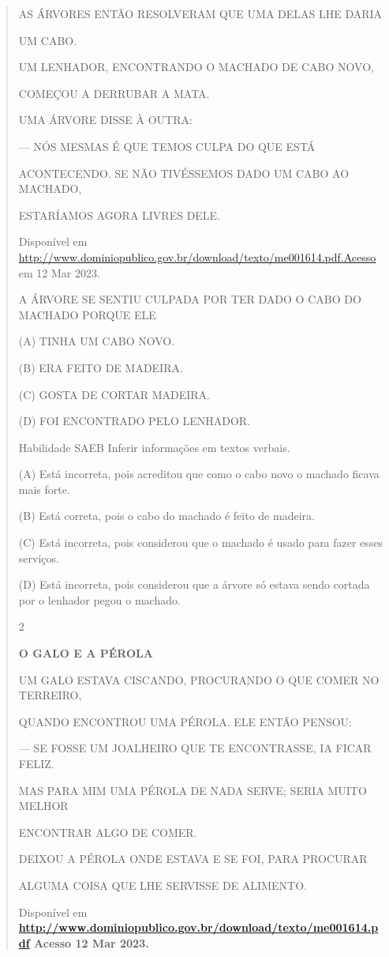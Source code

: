 {{{{\begin{verse}
{{\begin{escolha}
{{{{{AS ÁRVORES ENTÃO RESOLVERAM QUE UMA DELAS LHE DARIA

UM CABO.

UM LENHADOR, ENCONTRANDO O MACHADO DE CABO NOVO,

COMEÇOU A DERRUBAR A MATA.

UMA ÁRVORE DISSE À OUTRA:

--- NÓS MESMAS É QUE TEMOS CULPA DO QUE ESTÁ

ACONTECENDO. SE NÃO TIVÉSSEMOS DADO UM CABO AO MACHADO,

ESTARÍAMOS AGORA LIVRES DELE.

Disponível em
\url{http://www.dominiopublico.gov.br/download/texto/me001614.pdf.Acesso}
em 12 Mar 2023.

A ÁRVORE SE SENTIU CULPADA POR TER DADO O CABO DO MACHADO PORQUE ELE

(A) TINHA UM CABO NOVO.

(B) ERA FEITO DE MADEIRA.

(C) GOSTA DE CORTAR MADEIRA.

(D) FOI ENCONTRADO PELO LENHADOR.

Habilidade SAEB Inferir informações em textos verbais.

(A) Está incorreta, pois acreditou que como o cabo novo o machado ficava
mais forte.

(B) Está correta, pois o cabo do machado é feito de madeira.

(C) Está incorreta, pois considerou que o machado é usado para fazer
esses serviços.

(D) Está incorreta, pois considerou que a árvore só estava sendo cortada
por o lenhador pegou o machado.

\num{2}

\textbf{O GALO E A PÉROLA}

UM GALO ESTAVA CISCANDO, PROCURANDO O QUE COMER NO TERREIRO,

QUANDO ENCONTROU UMA PÉROLA. ELE ENTÃO PENSOU:

--- SE FOSSE UM JOALHEIRO QUE TE ENCONTRASSE, IA FICAR FELIZ.

MAS PARA MIM UMA PÉROLA DE NADA SERVE; SERIA MUITO MELHOR

ENCONTRAR ALGO DE COMER.

DEIXOU A PÉROLA ONDE ESTAVA E SE FOI, PARA PROCURAR

ALGUMA COISA QUE LHE SERVISSE DE ALIMENTO.

Disponível em
\textbf{\url{http://www.dominiopublico.gov.br/download/texto/me001614.pdf}
Acesso 12 Mar 2023.}

}}}}}
\end{escolha}}}
\end{verse}}}}}
